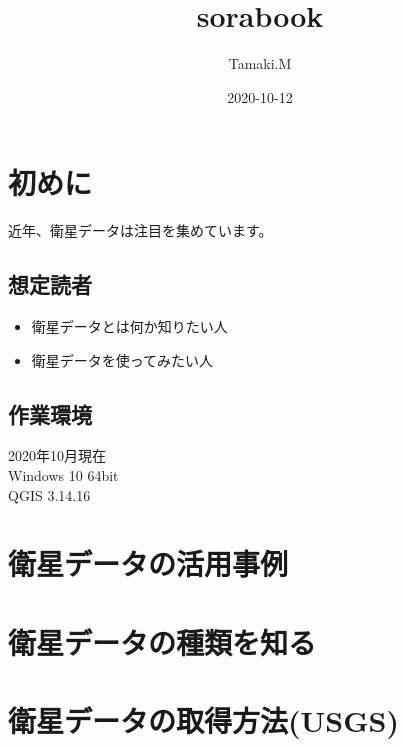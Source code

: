 \documentclass[
]{book}
\title{sorabook}
\author{Tamaki.M}
\date{2020-10-12}
\providecommand{\tightlist}{%
  \setlength{\itemsep}{0pt}\setlength{\parskip}{0pt}}
\begin{document}
\maketitle

{
\setcounter{tocdepth}{1}
\tableofcontents
}
\hypertarget{ux521dux3081ux306b}{%
\chapter*{初めに}\label{ux521dux3081ux306b}}

近年、衛星データは注目を集めています。

\hypertarget{ux60f3ux5b9aux8aadux8005}{%
\section{想定読者}\label{ux60f3ux5b9aux8aadux8005}}

\begin{itemize}
\tightlist
\item
  衛星データとは何か知りたい人
\item
  衛星データを使ってみたい人
\end{itemize}

\hypertarget{ux4f5cux696dux74b0ux5883}{%
\section{作業環境}\label{ux4f5cux696dux74b0ux5883}}

2020年10月現在\\
Windows 10 64bit\\
QGIS 3.14.16

\hypertarget{ux885bux661fux30c7ux30fcux30bfux306eux6d3bux7528ux4e8bux4f8b}{%
\chapter{衛星データの活用事例}\label{ux885bux661fux30c7ux30fcux30bfux306eux6d3bux7528ux4e8bux4f8b}}

\hypertarget{ux885bux661fux30c7ux30fcux30bfux306eux7a2eux985eux3092ux77e5ux308b}{%
\chapter{衛星データの種類を知る}\label{ux885bux661fux30c7ux30fcux30bfux306eux7a2eux985eux3092ux77e5ux308b}}

\hypertarget{ux885bux661fux30c7ux30fcux30bfux306eux53d6ux5f97ux65b9ux6cd5usgs}{%
\chapter{衛星データの取得方法(USGS)}\label{ux885bux661fux30c7ux30fcux30bfux306eux53d6ux5f97ux65b9ux6cd5usgs}}
\end{document}
